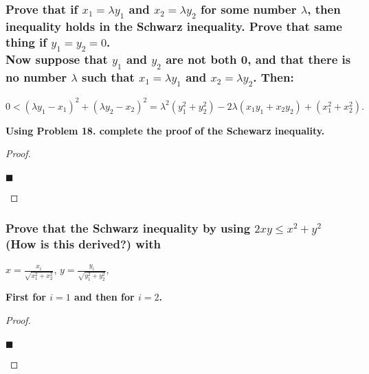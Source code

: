 \documentclass[letterpaper, 10 pt, conference]{ieeeconf}  %
\begin{document}
\begin{mdframed}
\subsubsection{\textbf{Prove that if $x_1 = \lambda y_1$ and $x_2 = \lambda y_2$ for some number $\lambda$, then inequality holds in the Schwarz inequality. Prove that same thing if $y_1 = y_2 = 0$. \\ Now suppose that $y_1$ and $y_2$ are not both 0, and that there is no number $\lambda$ such that $x_1 = \lambda y_1$ and $x_2 = \lambda y_2$. Then: }}

\begin{center}
    $0 < (\lambda y_1 - x_1)^2 + (\lambda y_2 - x_2)^2 = \lambda ^2(y_1^2 + y_2^2) - 2\lambda (x_1y_1 + x_2y_2) + (x_1^2 + x_2^2).$
\end{center}

\textbf{Using Problem 18. complete the proof of the Schewarz inequality.}
\end{mdframed}

\begin{proof}
\begin{align}
    
\end{align}
\begin{flushright}
$\blacksquare$
\end{flushright}
\end{proof}

\begin{mdframed}
\subsubsection{\textbf{Prove that the Schwarz inequality by using $2xy \leq x^2 + y^2$ (How is this derived?) with}}

\begin{center}
    $x = \frac{x_i}{\sqrt{x_1^2 + x_2^2}}$, \tab $y = \frac{y_i}{\sqrt{y_1^2 + y_2^2}}$,
\end{center}

\textbf{First for $i = 1$ and then for $i = 2$.}
\end{mdframed}

\begin{proof}
\begin{align}
    
\end{align}
\begin{flushright}
$\blacksquare$
\end{flushright}
\end{proof}
\end{document}
